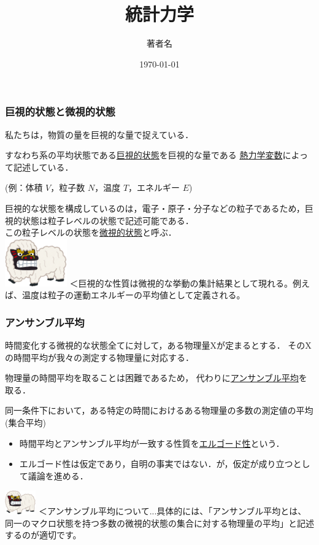 \documentclass{beamer}
\title{統計力学}
\author{著者名}
\date{\customDate\today}
\begin{document}
\frame{\titlepage}

\begin{frame}
    \frametitle{巨視的状態と微視的状態}
    私たちは，物質の量を巨視的な量で捉えている．

    すなわち系の平均状態である\underline{巨視的状態}を巨視的な量である
    \underline{熱力学変数}によって記述している．

    \hspace{0.5cm} (例：体積 \(V\)，粒子数 \(N\)，温度 \(T\)，エネルギー \(E\))

    巨視的な状態を構成しているのは，電子・原子・分子などの粒子であるため，巨視的状態は粒子レベルの状態で記述可能である．\\
    この粒子レベルの状態を\underline{微視的状態}と呼ぶ．\\

    \includegraphics[width=0.2\textwidth]{fig/okinawa_shishimai.eps} %
    ＜巨視的な性質は微視的な挙動の集計結果として現れる。例えば、温度は粒子の運動エネルギーの平均値として定義される。
\end{frame}


\begin{frame}
    \frametitle{アンサンブル平均}
    時間変化する微視的な状態全てに対して，ある物理量Xが定まるとする．
    そのXの時間平均が我々の測定する物理量に対応する．
    
    物理量の時間平均を取ることは困難であるため，
    代わりに\underline{アンサンブル平均}を取る．

    同一条件下において，ある特定の時間におけるある物理量の多数の測定値の平均(集合平均)
    \begin{itemize}
      \item 時間平均とアンサンブル平均が一致する性質を\underline{エルゴード性}という．
      \item エルゴード性は仮定であり，自明の事実ではない．が，仮定が成り立つとして議論を進める．
    \end{itemize}

    \includegraphics[width=0.1\textwidth]{fig/okinawa_shishimai.eps}
    ＜アンサンブル平均について...具体的には、「アンサンブル平均とは、同一のマクロ状態を持つ多数の微視的状態の集合に対する物理量の平均」と記述するのが適切です。
\end{frame}
\end{document}
